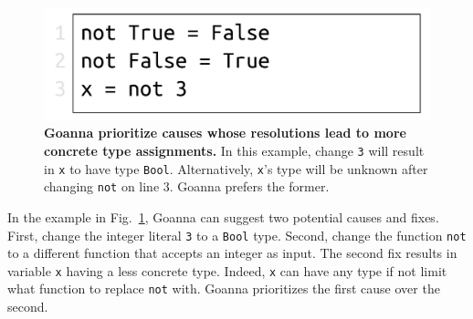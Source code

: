 \documentclass[pdflatex,sn-mathphys-num]{sn-jnl}%
\begin{document}
	
   \begin{figure}[ht!]
        \centering
        \includegraphics[width=0.5\linewidth]{images/Specificity}
        \caption[Goanna prioritize causes whose resolutions lead to more concrete type assignments]{\textbf{Goanna prioritize causes whose resolutions lead to more concrete type assignments.} In this example, change \texttt{3} will result in \texttt{x} to have type \texttt{Bool}. Alternatively, \texttt{x}'s type will be unknown after changing \texttt{not} on line 3. Goanna prefers the former.} 
        \label{fig:specificity}
    \end{figure}

    In the example in Fig.~\ref{fig:specificity}, Goanna can suggest two potential causes and fixes. First, change the integer literal \texttt{3} to a \texttt{Bool} type. Second, change the function \texttt{not} to a different function that accepts an integer as input. The second fix results in variable \texttt{x} having a less concrete type. Indeed, \texttt{x} can have any type if not limit what function to replace \texttt{not} with. Goanna prioritizes the first cause over the second. 

    
    

\end{document}
